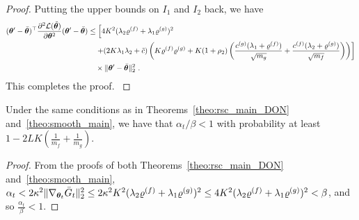 \begin{proof}
Putting the upper bounds on $I_1$ and $I_2$ back, we have
\begin{align*}
({\bm{\theta}}'-\bar{{\bm{\theta}}})^\top \frac{\partial^2 {\cal L}(\tilde{{\bm{\theta}}})}{\partial {\bm{\theta}}^2} ({\bm{\theta}}'-\bar{{\bm{\theta}}})
& \leq \left[ 
4K^2(\lambda_2\varrho^{(f)}+\lambda_1\varrho^{(g)})^2 \right.\\
&\left.\quad 
+
(2K\lambda_1\lambda_2+\tilde{c})\left(K\varrho^{(f)}\varrho^{(g)}+K(1+\rho_2) 
\left( \frac{c^{(g)} (\lambda_1+\varrho^{(f)})}{\sqrt{m_g}} + \frac{c^{(f)} (\lambda_2+\varrho^{(g)})}{\sqrt{m_f}} \right)\right)
\right]\\
&\quad \times \| {\bm{\theta}}' - \bar{{\bm{\theta}}} \|_2^2~.
\end{align*}
This completes the proof.
\label{theo:smooth}
\end{proof}

\begin{prop}
\label{prop:RSC-smooth-DON}
Under the same conditions as in Theorems~\ref{theo:rsc_main_DON} and~\ref{theo:smooth_main}, we have that $\alpha_t/\beta<1$ with probability at least $1-2LK(\frac{1}{m_f}+\frac{1}{m_g})$.
\end{prop}
\begin{proof}
From the proofs of both Theorems~\ref{theo:rsc_main_DON} and~\ref{theo:smooth_main},
$\alpha_t<2\kappa^2\lVert\nabla_{{\bm{\theta}}_t}\bar{G}_t\rVert_2^2\leq 2\kappa^2 K^2(\lambda_2\varrho^{(f)}+\lambda_1\varrho^{(g)})^2\leq
4 K^2(\lambda_2\varrho^{(f)}+\lambda_1\varrho^{(g)})^2<
\beta$, and so $\frac{\alpha_t}{\beta}<1$.
\end{proof}
